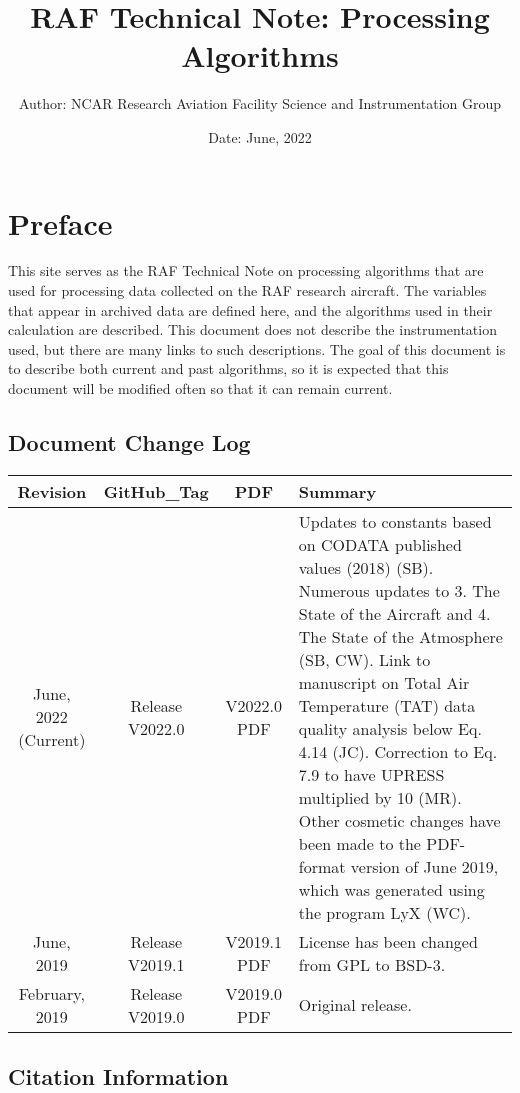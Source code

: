 \documentclass[
]{book}
\title{RAF Technical Note: Processing Algorithms}
\author{Author: NCAR Research Aviation Facility Science and Instrumentation Group}
\date{Date: June, 2022}
\begin{document}
\maketitle

{
\setcounter{tocdepth}{1}
\tableofcontents
}
\hypertarget{index}{%
\chapter*{Preface}\label{index}}

This site serves as the RAF Technical Note on processing algorithms that are used for processing data collected on the RAF research aircraft. The variables that appear in archived data are defined here, and the algorithms used in their calculation are described. This document does not describe the instrumentation used, but there are many links to such descriptions. The goal of this document is to describe both current and past algorithms, so it is expected that this document will be modified often so that it can remain current.

\hypertarget{document-change-log}{%
\section{Document Change Log}\label{document-change-log}}

\begin{table}
\centering
\begin{tabular}{c|c|c|l}
\hline
Revision & GitHub\_Tag & PDF & Summary\\
\hline
June, 2022 (Current) & Release V2022.0 & V2022.0 PDF & Updates to constants based on CODATA published values (2018) (SB). Numerous updates to 3. The State of the Aircraft and 4. The State of the Atmosphere (SB, CW). Link to manuscript on Total Air Temperature (TAT) data quality analysis below Eq. 4.14 (JC). Correction to Eq. 7.9 to have UPRESS multiplied by 10 (MR). Other cosmetic changes have been made to the PDF-format version of June 2019, which was generated using the program LyX (WC).\\
\hline
June, 2019 & Release V2019.1 & V2019.1 PDF & License has been changed from GPL to BSD-3.\\
\hline
February, 2019 & Release V2019.0 & V2019.0 PDF & Original release.\\
\hline
\end{tabular}
\end{table}

\hypertarget{citation-information}{%
\section{Citation Information}\label{citation-information}}
\end{document}
